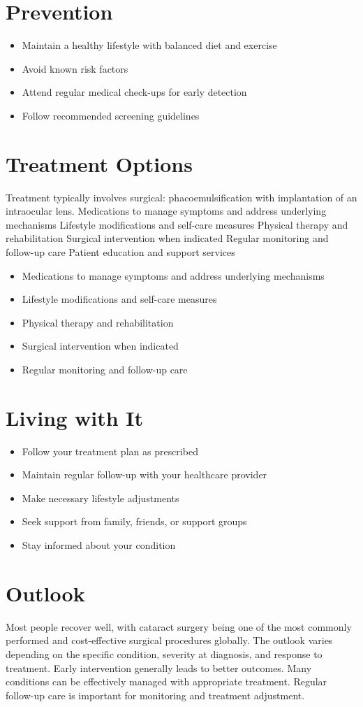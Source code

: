 \section{Prevention}
\begin{itemize}[noitemsep]
  \item Maintain a healthy lifestyle with balanced diet and exercise
  \item Avoid known risk factors
  \item Attend regular medical check-ups for early detection
  \item Follow recommended screening guidelines
\end{itemize}
\section{Treatment Options}
Treatment typically involves surgical: phacoemulsification with implantation of an intraocular lens. Medications to manage symptoms and address underlying mechanisms Lifestyle modifications and self-care measures Physical therapy and rehabilitation Surgical intervention when indicated Regular monitoring and follow-up care Patient education and support services

\begin{itemize}[noitemsep]
  \item Medications to manage symptoms and address underlying mechanisms
  \item Lifestyle modifications and self-care measures
  \item Physical therapy and rehabilitation
  \item Surgical intervention when indicated
  \item Regular monitoring and follow-up care
\end{itemize}
\section{Living with It}
\begin{itemize}[noitemsep]
  \item Follow your treatment plan as prescribed
  \item Maintain regular follow-up with your healthcare provider
  \item Make necessary lifestyle adjustments
  \item Seek support from family, friends, or support groups
  \item Stay informed about your condition
\end{itemize}
\section{Outlook}
Most people recover well, with cataract surgery being one of the most commonly performed and cost-effective surgical procedures globally. The outlook varies depending on the specific condition, severity at diagnosis, and response to treatment. Early intervention generally leads to better outcomes. Many conditions can be effectively managed with appropriate treatment. Regular follow-up care is important for monitoring and treatment adjustment.
